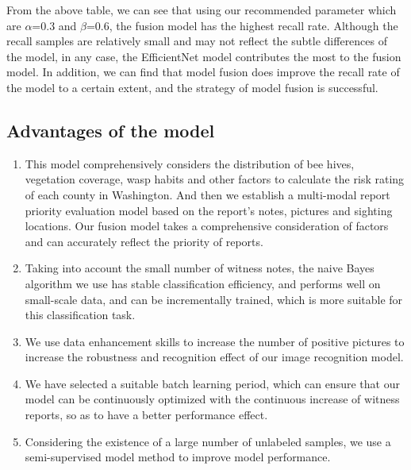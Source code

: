 \documentclass{mcmthesis}
\numberwithin{figure}{section}
\numberwithin{table}{section}
\begin{document}

From the above table, we can see that using our recommended parameter which are $\alpha$=0.3 and $\beta$=0.6, the fusion model has the highest recall rate. Although the recall samples are relatively small and may not reflect the subtle differences of the model, in any case, the EfficientNet model contributes the most to the fusion model. In addition, we can find that model fusion does improve the recall rate of the model to a certain extent, and the strategy of model fusion is successful.

\subsection{Advantages of the model}

\begin{enumerate}
  \item This model comprehensively considers the distribution of bee hives, vegetation coverage, wasp habits and other factors to calculate the risk rating of each county in Washington. And then we establish a multi-modal report priority evaluation model based on the report's notes, pictures and sighting locations. Our fusion model takes a comprehensive consideration of factors and can accurately reflect the priority of reports.
  \item Taking into account the small number of witness notes, the naive Bayes algorithm we use has stable classification efficiency, and performs well on small-scale data, and can be incrementally trained, which is more suitable for this classification task.
  \item We use data enhancement skills to increase the number of positive pictures to increase the robustness and recognition effect of our image recognition model.
  \item We have selected a suitable batch learning period, which can ensure that our model can be continuously optimized with the continuous increase of witness reports, so as to have a better performance effect.
  \item Considering the existence of a large number of unlabeled samples, we use a semi-supervised model method to improve model performance.
\end{enumerate}
\end{document}

